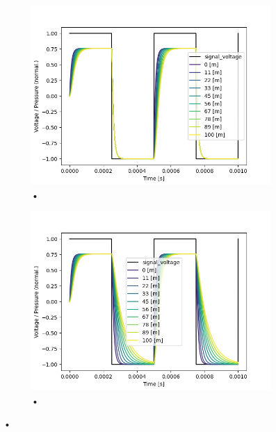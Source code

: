 \documentclass[fontsize=12pt, a4paper]{scrartcl}
\begin{document}
\begin{figure}[H]
	\centering
	\begin{subfigure}[H]{0.48\textwidth}
		\includegraphics[width=\textwidth, valign=t]{bilder/tubelength/tl_out_branch_multisweep.png}
		\caption{•}
	\end{subfigure}
	\begin{subfigure}[H]{0.48\textwidth}
		\includegraphics[width=\textwidth, valign=t]{bilder/tubelength/tl_both_branch_multisweep.png}
		\caption{•}
	\end{subfigure}
	\caption{•}
\end{figure}
\end{document}
